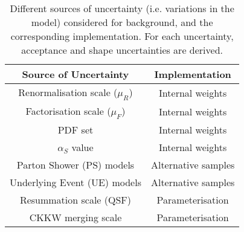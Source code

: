 %
\begin{table}[ht]
    \footnotesize\centering
    \setlength{\tabcolsep}{0.5em} %
    \begin{tabular}{cc}
        \toprule\hline
        \textbf{Source of Uncertainty}      & \textbf{Implementation} 
        \\
        \hline
        Renormalisation scale ($\mu_R$)     & Internal weights 
        \\
        Factorisation scale ($\mu_F$)       & Internal weights 
        \\
        PDF set                             & Internal weights
        \\
        $\alpha_S$ value                    & Internal weights
        \\
        Parton Shower (PS) models           & Alternative samples 
        \\
        Underlying Event (UE) models        & Alternative samples 
        \\
        Resummation scale (QSF)             & Parameterisation
        \\
        CKKW merging scale                  & Parameterisation
        \\
        \hline\bottomrule
    \end{tabular}
    \caption{Different sources of uncertainty (i.e. variations in the model) considered for \Vjets background, and the corresponding implementation. For each uncertainty, acceptance and shape uncertainties are derived.}
    \label{tab:sources_of_uncertainty}
\end{table}
%